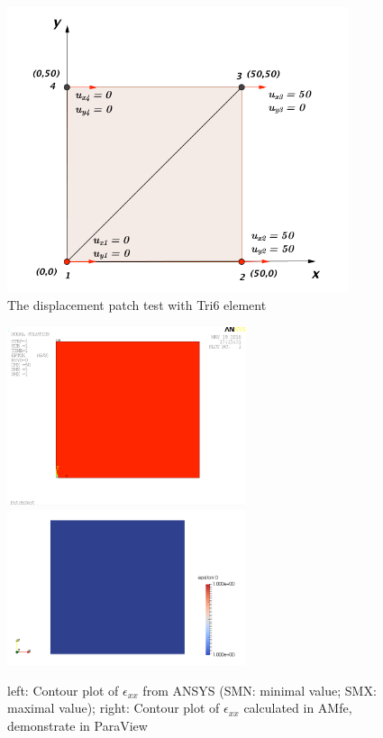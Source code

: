 \begin{figure}
	\begin{center}
		\includegraphics[width=10cm,clip]{PatchMuster.pdf} 			
		\caption{The displacement patch test with Tri6 element} \label{fig: PatchMuster}
	\end{center}
\end{figure}

\begin{figure}
	\begin{center}
		\includegraphics[width=7cm,clip]{PatchTest.png} 		
		\includegraphics[width=7cm,clip]{PatchParaView.pdf} 		
		\caption{left: Contour plot of $\epsilon_{xx}$ from ANSYS (SMN: minimal value; SMX: maximal value); right: Contour plot of $\epsilon_{xx}$ calculated in AMfe, demonstrate in ParaView} \label{fig: PatchTest}
	\end{center}
\end{figure}


